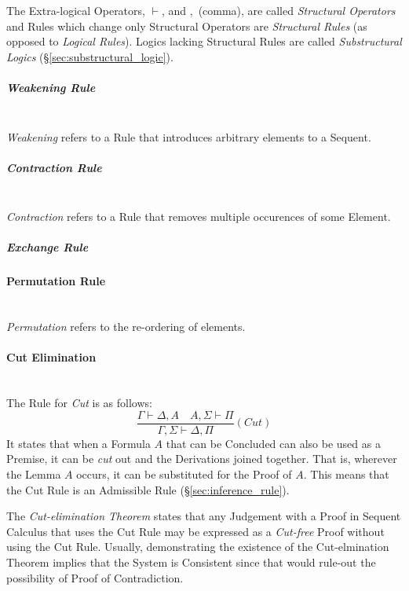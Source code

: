 The Extra-logical Operators, $\vdash$, and $,$ (comma), are called
\emph{Structural Operators} and Rules which change only Structural
Operators are \emph{Structural Rules} (as opposed to \emph{Logical
  Rules}). Logics lacking Structural Rules are called
\emph{Substructural Logics} (\S\ref{sec:substructural_logic}).



\subparagraph{Weakening Rule}\label{sec:weakening_rule} \hfill \\

\emph{Weakening} refers to a Rule that introduces arbitrary elements
to a Sequent.



\subparagraph{Contraction Rule}\label{sec:contraction_rule} \hfill \\

\emph{Contraction} refers to a Rule that removes
multiple occurences of some Element.



\subparagraph{Exchange Rule}\label{sec:exchange_rule}



\paragraph{Permutation Rule}\label{sec:permutation_rule} \hfill \\

\emph{Permutation} refers to the re-ordering of elements.



\paragraph{Cut Elimination}\label{sec:cut_elimination} \hfill \\

The Rule for \emph{Cut} is as follows:
\[
  \frac{
    \Gamma \vdash \Delta, A \quad A, \Sigma \vdash \Pi
  }{
    \Gamma, \Sigma \vdash \Delta, \Pi
  }(Cut)
\]
It states that when a Formula $A$ that can be Concluded can also be
used as a Premise, it can be \emph{cut} out and the Derivations joined
together. That is, wherever the Lemma $A$ occurs, it can be
substituted for the Proof of $A$. This means that the Cut Rule is an
Admissible Rule (\S\ref{sec:inference_rule}).

The \emph{Cut-elimination Theorem} states that any Judgement with a
Proof in Sequent Calculus that uses the Cut Rule may be expressed as a
\emph{Cut-free} Proof without using the Cut Rule. Usually,
demonstrating the existence of the Cut-elmination Theorem implies that
the System is Consistent since that would rule-out the possibility of
Proof of Contradiction.

